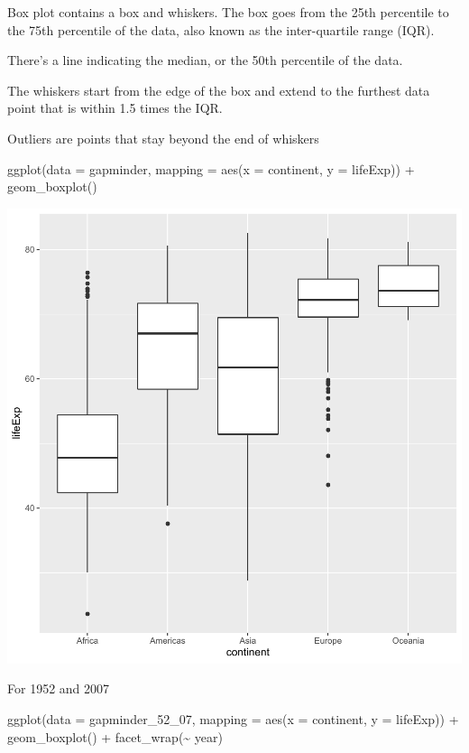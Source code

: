 \documentclass[
]{book}
\makeatletter
\newenvironment{Shaded}{\begin{snugshade}}{\end{snugshade}}
\newcommand{\AttributeTok}[1]{\textcolor[rgb]{0.61,0.61,0.61}{#1}}
\newcommand{\FunctionTok}[1]{\textcolor[rgb]{0,0,0}{#1}}
\newcommand{\NormalTok}[1]{#1}
\newcommand{\SpecialCharTok}[1]{\textcolor[rgb]{0,0,0}{#1}}
\newenvironment{kframe}{%
\medskip{}
\setlength{\fboxsep}{.8em}
 \def\at@end@of@kframe{}%
 \ifinner\ifhmode%
  \def\at@end@of@kframe{\end{minipage}}%
  \begin{minipage}{\columnwidth}%
 \fi\fi%
 \def\FrameCommand##1{\hskip\@totalleftmargin \hskip-\fboxsep
 \colorbox{shadecolor}{##1}\hskip-\fboxsep
     \hskip-\linewidth \hskip-\@totalleftmargin \hskip\columnwidth}%
 \MakeFramed {\advance\hsize-\width
   \@totalleftmargin\z@ \linewidth\hsize
   \@setminipage}}%
 {\par\unskip\endMakeFramed%
 \at@end@of@kframe}
\renewenvironment{Shaded}{\begin{kframe}}{\end{kframe}}
\makeatother
\begin{document}
Box plot contains a box and whiskers. The box goes from the 25th percentile to the 75th percentile of the data, also known as the inter-quartile range (IQR).

There's a line indicating the median, or the 50th percentile of the data.

The whiskers start from the edge of the box and extend to the furthest data point that is within 1.5 times the IQR.

Outliers are points that stay beyond the end of whiskers

\begin{Shaded}
\begin{Highlighting}[]
\FunctionTok{ggplot}\NormalTok{(}\AttributeTok{data =}\NormalTok{ gapminder, }\AttributeTok{mapping =} \FunctionTok{aes}\NormalTok{(}\AttributeTok{x =}\NormalTok{ continent, }\AttributeTok{y =}\NormalTok{ lifeExp)) }\SpecialCharTok{+}
  \FunctionTok{geom\_boxplot}\NormalTok{()}
\end{Highlighting}
\end{Shaded}

\begin{center}\includegraphics[width=0.7\linewidth,keepaspectratio]{Multivariable_Data_Analysis_files/figure-latex/unnamed-chunk-84-1} \end{center}

For 1952 and 2007

\begin{Shaded}
\begin{Highlighting}[]
\FunctionTok{ggplot}\NormalTok{(}\AttributeTok{data =}\NormalTok{ gapminder\_52\_07, }\AttributeTok{mapping =} \FunctionTok{aes}\NormalTok{(}\AttributeTok{x =}\NormalTok{ continent, }\AttributeTok{y =}\NormalTok{ lifeExp)) }\SpecialCharTok{+}
  \FunctionTok{geom\_boxplot}\NormalTok{() }\SpecialCharTok{+}
  \FunctionTok{facet\_wrap}\NormalTok{(}\SpecialCharTok{\textasciitilde{}}\NormalTok{ year)}
\end{Highlighting}
\end{Shaded}
\end{document}

